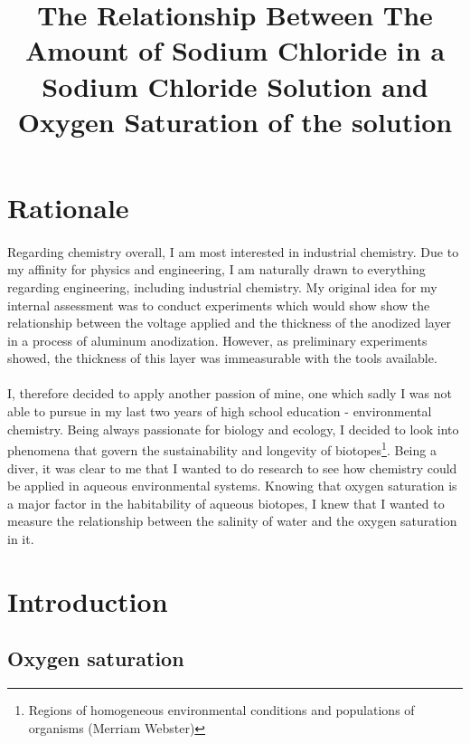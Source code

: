 \documentclass[a4paper]{article}
\begin{document}
\title{The Relationship Between The Amount of Sodium Chloride in a Sodium
Chloride Solution and Oxygen Saturation of the solution}
\author{}
\date{}
\maketitle

\doublespacing

\section*{Rationale}

\paragraph*{}
Regarding chemistry overall, I am most interested in industrial chemistry. Due
to my affinity for physics and engineering, I am naturally drawn to everything
regarding engineering, including industrial chemistry. My original idea for my
internal assessment was to conduct experiments which would show show the
relationship between the voltage applied and the thickness of the anodized
layer in a process of aluminum anodization. However, as preliminary
experiments showed, the thickness of this layer was immeasurable with the tools
available.

\paragraph*{}
I, therefore decided to apply another passion of mine, one which sadly I was
not able to pursue in my last two years of high school education -
environmental chemistry. Being always passionate for biology and ecology, I
decided to look into phenomena that govern the sustainability and longevity of
biotopes\footnote{Regions of homogeneous environmental conditions and
populations of organisms (Merriam Webster)}. Being a diver, it was clear to me
that I wanted to do research to see how chemistry could be applied in aqueous
environmental systems. Knowing that oxygen saturation is a major factor in the
habitability of aqueous biotopes, I knew that I wanted to measure the
relationship between the salinity of water and the oxygen saturation in it.

\section{Introduction}

\subsection{Oxygen saturation}
\end{document}

